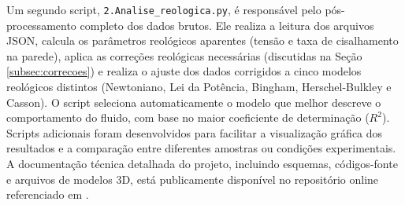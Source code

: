 \documentclass[article,12pt,oneside,a4paper,english,brazil,sumario=tradicional]{abntex2}
\begin{document}
Um segundo script, \texttt{2.Analise\_reologica.py}, é responsável pelo pós-processamento completo dos dados brutos. Ele realiza a leitura dos arquivos JSON, calcula os parâmetros reológicos aparentes (tensão e taxa de cisalhamento na parede), aplica as correções reológicas necessárias (discutidas na Seção \ref{subsec:correcoes}) e realiza o ajuste dos dados corrigidos a cinco modelos reológicos distintos (Newtoniano, Lei da Potência, Bingham, Herschel-Bulkley e Casson). O script seleciona automaticamente o modelo que melhor descreve o comportamento do fluido, com base no maior coeficiente de determinação ($R^2$). Scripts adicionais foram desenvolvidos para facilitar a visualização gráfica dos resultados e a comparação entre diferentes amostras ou condições experimentais. A documentação técnica detalhada do projeto, incluindo esquemas, códigos-fonte e arquivos de modelos 3D, está publicamente disponível no repositório online referenciado em .
\end{document}
